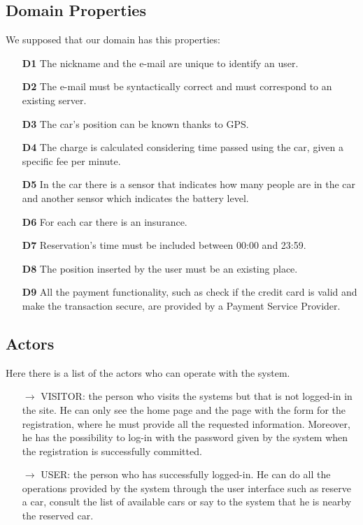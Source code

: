 \subsection{Domain Properties} \label{subsec:domain}
We supposed that our domain has this properties:
\begin{itemize}
\item[\textbf{D1}]The nickname and the e-mail are unique to identify an user.
\item[\textbf{D2}]The e-mail must be syntactically correct and must correspond to an existing server.
\item[\textbf{D3}]The car's position can be known thanks to GPS.
\item[\textbf{D4}]The charge is calculated considering time passed using the car, given a specific fee per minute.
\item[\textbf{D5}]In the car there is a sensor that indicates how many people %
 are in the car and another sensor which indicates the battery level.
\item[\textbf{D6}]For each car there is an insurance.
\item[\textbf{D7}]Reservation's time must be included between 00:00 and 23:59.
\item[\textbf{D8}]The position inserted by the user must be an existing place.
\item[\textbf{D9}]All the payment functionality, such as check if the credit card is valid and make the transaction secure, are provided by a Payment Service Provider.
\end{itemize}


\subsection{Actors} \label{subsec:actors}
Here there is a list of the actors who can operate with the system.
\begin{itemize}
\item[\textbf{$\rightarrow$}] VISITOR: the person who visits the systems but that is not logged-in in the site. He can only see the home page and the page with the form for the registration, where he must provide all the requested information. Moreover, he has the possibility to log-in with the password given by the system when the registration is successfully committed. 
\item[\textbf{$\rightarrow$}] USER: the person who has successfully logged-in. He can do all the operations provided by the system through the user interface such as reserve a car, consult the list of available cars or say to the system that he is nearby the reserved car. 
\end{itemize}

